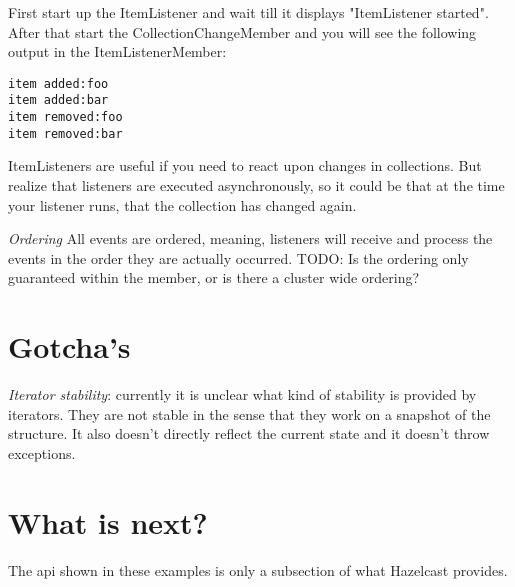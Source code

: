 First start up the ItemListener and wait till it displays "ItemListener started". After that start the CollectionChangeMember and you will see the following output in the ItemListenerMember:
\begin{verbatim}
item added:foo
item added:bar
item removed:foo
item removed:bar
\end{verbatim}
ItemListeners are useful if you need to react upon changes in collections. But realize that listeners are executed asynchronously, so it could be that at the time your listener runs, that the collection has changed again. 

\emph{Ordering} All events are ordered, meaning, listeners will receive and process the events in the order they are actually occurred. TODO: Is the ordering only guaranteed within the member, or is there a cluster wide ordering?

\section{Gotcha's}
\emph{Iterator stability}: currently it is unclear what kind of stability is provided by iterators. They are not stable in the sense that they work on a snapshot of the structure. It also doesn't directly reflect the current state and it doesn't throw exceptions.

\section{What is next?}
The api shown in these examples is only a subsection of what Hazelcast provides.